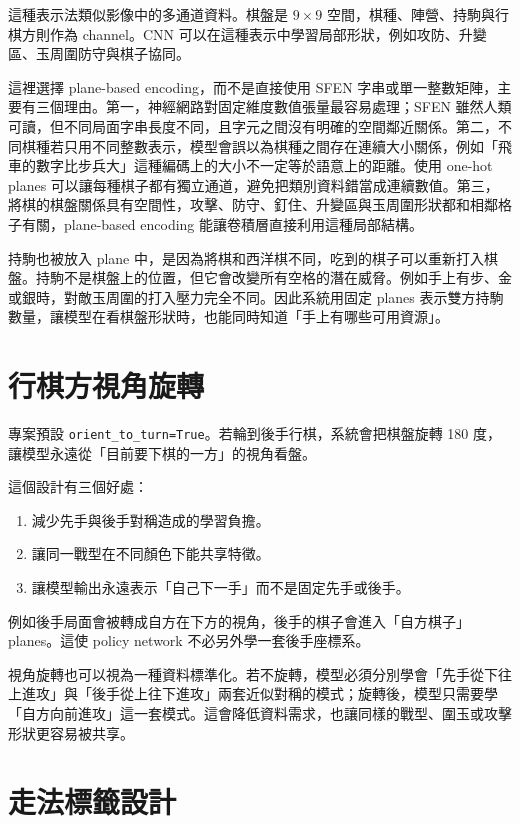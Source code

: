 \documentclass[12pt,a4paper,fontset=none]{ctexart}
\begin{document}
這種表示法類似影像中的多通道資料。棋盤是 $9 \times 9$ 空間，棋種、陣營、持駒與行棋方則作為 channel。CNN 可以在這種表示中學習局部形狀，例如攻防、升變區、玉周圍防守與棋子協同。

這裡選擇 plane-based encoding，而不是直接使用 SFEN 字串或單一整數矩陣，主要有三個理由。第一，神經網路對固定維度數值張量最容易處理；SFEN 雖然人類可讀，但不同局面字串長度不同，且字元之間沒有明確的空間鄰近關係。第二，不同棋種若只用不同整數表示，模型會誤以為棋種之間存在連續大小關係，例如「飛車的數字比步兵大」這種編碼上的大小不一定等於語意上的距離。使用 one-hot planes 可以讓每種棋子都有獨立通道，避免把類別資料錯當成連續數值。第三，將棋的棋盤關係具有空間性，攻擊、防守、釘住、升變區與玉周圍形狀都和相鄰格子有關，plane-based encoding 能讓卷積層直接利用這種局部結構。

持駒也被放入 plane 中，是因為將棋和西洋棋不同，吃到的棋子可以重新打入棋盤。持駒不是棋盤上的位置，但它會改變所有空格的潛在威脅。例如手上有步、金或銀時，對敵玉周圍的打入壓力完全不同。因此系統用固定 planes 表示雙方持駒數量，讓模型在看棋盤形狀時，也能同時知道「手上有哪些可用資源」。

\section{行棋方視角旋轉}

專案預設 \texttt{orient\_to\_turn=True}。若輪到後手行棋，系統會把棋盤旋轉 180 度，讓模型永遠從「目前要下棋的一方」的視角看盤。

這個設計有三個好處：

\begin{enumerate}
  \item 減少先手與後手對稱造成的學習負擔。
  \item 讓同一戰型在不同顏色下能共享特徵。
  \item 讓模型輸出永遠表示「自己下一手」而不是固定先手或後手。
\end{enumerate}

例如後手局面會被轉成自方在下方的視角，後手的棋子會進入「自方棋子」planes。這使 policy network 不必另外學一套後手座標系。

視角旋轉也可以視為一種資料標準化。若不旋轉，模型必須分別學會「先手從下往上進攻」與「後手從上往下進攻」兩套近似對稱的模式；旋轉後，模型只需要學「自方向前進攻」這一套模式。這會降低資料需求，也讓同樣的戰型、圍玉或攻擊形狀更容易被共享。

\section{走法標籤設計}
\end{document}
